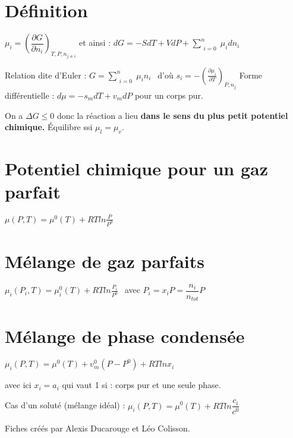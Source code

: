 \documentclass[9pt,twocolumn]{article}
\begin{document}
\section{Définition}

$\boxed{\mu_i=\left(\dfrac{\partial G}{\partial n_i}\right)_{T,P,n_{j\neq i}}}$ et ainsi : $dG=-SdT+VdP+\sum\limits_{\substack{i=0}}^{n}  \mu_i dn_i$

Relation dite d'Euler : $\boxed{G=\sum\limits_{\substack{i=0}}^{n}  \mu_i n_i}\>\>$ d'où $s_i=-\left(\frac{\partial \mu_i}{\partial T}\right) _{P,n_j}$ 
\bigbreak
Forme différentielle : $\boxed{d\mu=-s_mdT+v_mdP}$ pour un corps pur.
\bigbreak

On a $\Delta G\leq0$ donc la réaction a lieu \textbf{dans le sens du plus petit potentiel chimique.} Équilibre ssi $\mu_l=\mu_v$.

\section{Potentiel chimique pour un gaz parfait}

$\boxed{\mu(P,T)=\mu^0(T)+RT ln\frac{P}{P^0}}$

\section{Mélange de gaz parfaits}

$\boxed{\mu_i(P_i,T)=\mu_i^0(T)+RT ln\frac{P_i}{P^0}}\>\>$ avec $P_i=x_iP=\dfrac{n_i}{n_{tot}}P$


\section{Mélange de phase condensée}

$\boxed{\mu_i(P,T)=\mu^0(T)+v_m^0(P-P^0)+RT ln x_i}$ 

avec ici $x_i=a_i$ qui vaut 1 si : corps pur et une seule phase.
\bigbreak

Cas d'un soluté (mélange idéal) : $\boxed{\mu_i(P,T)=\mu^0(T)+RT ln \dfrac{c_i}{c^0}}$ 

\vfill
\footnotesize{Fiches créés par Alexis Ducarouge et Léo Colisson.}
\end{document}
